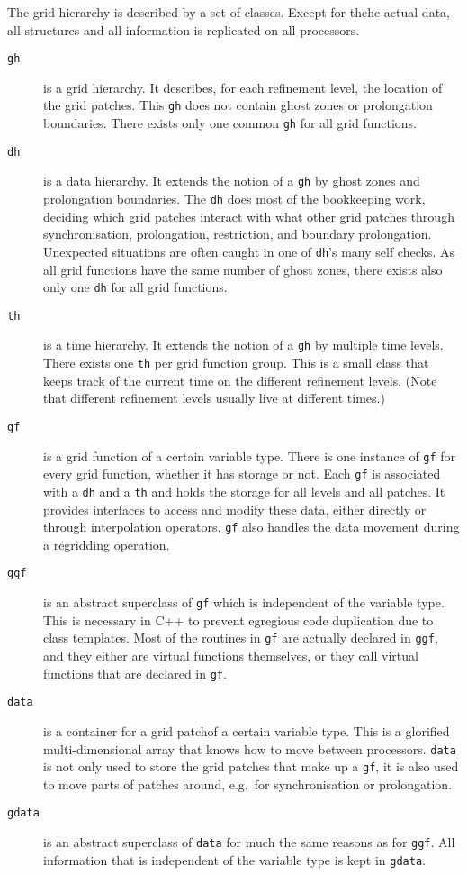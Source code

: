 \documentclass{article}
\begin{document}
   The grid hierarchy is described by a set of classes.  Except for
   thehe actual data, all structures and all information is replicated
   on all processors.
\begin{description}
\item[\texttt{gh}]
   is a grid hierarchy.  It describes, for each refinement level, the
   location of the grid patches.  This \texttt{gh} does not contain
   ghost zones or prolongation boundaries.  There exists only one
   common \texttt{gh} for all grid functions.
\item[\texttt{dh}]
   is a data hierarchy.  It extends the notion of a \texttt{gh} by
   ghost zones and prolongation boundaries.  The \texttt{dh} does most
   of the bookkeeping work, deciding which grid patches interact with
   what other grid patches through synchronisation, prolongation,
   restriction, and boundary prolongation.  Unexpected situations are
   often caught in one of \texttt{dh}'s many self checks.  As all grid
   functions have the same number of ghost zones, there exists also
   only one \texttt{dh} for all grid functions.
\item[\texttt{th}]
   is a time hierarchy.  It extends the notion of a \texttt{gh} by
   multiple time levels.  There exists one \texttt{th} per grid
   function group.  This is a small class that keeps track of the
   current time on the different refinement levels.  (Note that
   different refinement levels usually live at different times.)
\item[\texttt{gf}]
   is a grid function of a certain variable type.  There is one
   instance of \texttt{gf} for every grid function, whether it has
   storage or not.  Each \texttt{gf} is associated with a \texttt{dh}
   and a \texttt{th} and holds the storage for all levels and all
   patches.  It provides interfaces to access and modify these data,
   either directly or through interpolation operators.  \texttt{gf}
   also handles the data movement during a regridding operation.
\item[\texttt{ggf}]
   is an abstract superclass of \texttt{gf} which is independent of
   the variable type.  This is necessary in C++ to prevent egregious
   code duplication due to class templates.  Most of the routines in
   \texttt{gf} are actually declared in \texttt{ggf}, and they either
   are virtual functions themselves, or they call virtual functions
   that are declared in \texttt{gf}.
\item[\texttt{data}]
   is a container for a grid patchof a certain variable type.  This is
   a glorified multi-dimensional array that knows how to move between
   processors.  \texttt{data} is not only used to store the grid
   patches that make up a \texttt{gf}, it is also used to move parts
   of patches around, e.g.\ for synchronisation or prolongation.
\item[\texttt{gdata}]
   is an abstract superclass of \texttt{data} for much the same
   reasons as for \texttt{ggf}.  All information that is independent
   of the variable type is kept in \texttt{gdata}.
\end{description}
\end{document}
